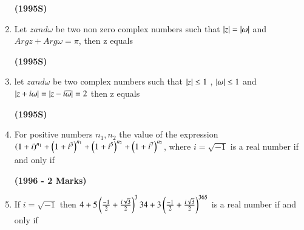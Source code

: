 \documentclass[journal,12pt,twocolumn]{IEEEtran}
\theoremstyle{remark}
\begin{document}
\begin{enumerate}[start=6]
\hfill{\textbf{(1995S)}}

\begin{enumerate}
\end{enumerate}
\item Let $z and \omega$ be two non zero complex numbers such that $\left\vert z\right\vert=\left\vert\omega\right\vert$ and $Argz+Arg\omega=\pi$, then z equals 

\hfill{\textbf{(1995S)}}

\begin{enumerate}
\end{enumerate}
\item let $z and \omega$ be two complex numbers such that $\left\vert z\right\vert\leq1$ , $\left\vert\omega\right\vert\leq1$ and $\left\vert z+i\omega\right\vert=\left\vert z-i\overline{\omega}\right\vert=2$ then z equals 

\hfill{\textbf{(1995S)}}

\begin{enumerate}
\end{enumerate}
\item For positive numbers $n_1,n_2$ the value of the expression $\left(1+i\right)^{n_1}+\left(1+i^3\right)^{n_1}+\left(1+i^5\right)^{n_2}+\left(1+i^7\right)^{n_2}$, where $i=\sqrt{-1}$ is a real number if and only if

\hfill{\textbf{(1996 - 2 Marks)}}

\begin{enumerate}
\end{enumerate}
\item If $i=\sqrt{-1}$ then $4+5\left(\frac{-1}{2}+\frac{i\sqrt{3}}{2}\right)^334 + 3\left(\frac{-1}{2}+\frac{i\sqrt{3}}{2}\right)^{365}$ is a real number if and only if 


\end{enumerate}
\end{document}
